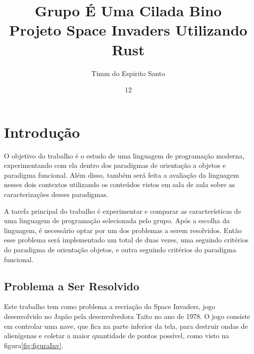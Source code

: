 \documentclass[rel_mlp]{iiufrgs}
\title{Grupo É Uma Cilada Bino \\ Projeto Space Invaders Utilizando Rust\\ }
\author{Timm do Espirito Santo}{Augusto} %
\date{12}{2018}
\begin{document}
\maketitle      


\tableofcontents








%
\chapter{Introdução} \label{intro}
O objetivo do trabalho é o estudo de uma linguagem de programação moderna, experimentando com ela dentro dos paradigmas de orientação a objetos e paradigma funcional. Além disso, também será feita a avaliação da linguagem nesses dois contextos utilizando os conteúdos vistos em sala de aula sobre as caracterizações desses paradigmas.

A tarefa principal do trabalho é experimentar e comparar as características de uma linguagem de programação selecionada pelo grupo. Após a escolha da linguagem, é necessário optar por um dos problemas a serem resolvidos. Então esse problema será implementado um total de duas vezes, uma seguindo critérios do paradigma de orientação  objetos, e outra seguindo critérios do paradigma funcional.


\section{Problema a Ser Resolvido}
Este trabalho tem como problema a recriação do Space Invaders, jogo desenvolvido no Japão pela desenvolvedora Taito no ano de 1978. O jogo consiste em controlar uma nave, que fica na parte inferior da tela, para destruir ondas de alienígenas e coletar a maior quantidade de pontos possível, como visto na figura\ref{fig:figuraInv}. 
\end{document}
